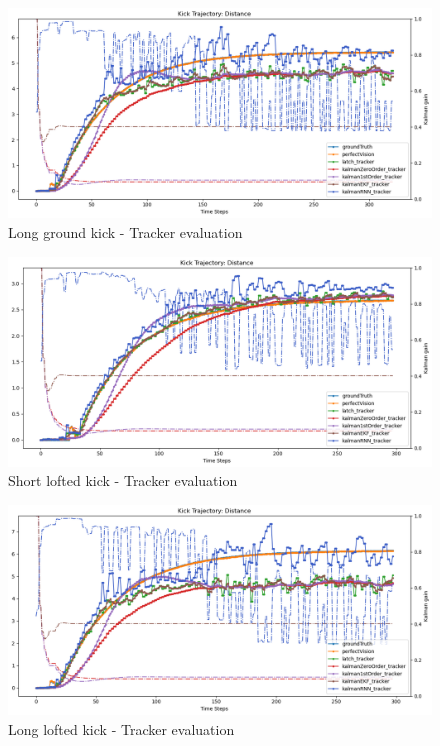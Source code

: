 \documentclass[a4paper,twoside,12pt]{report}
\begin{document}
\begin{figure}[h!]
\begin{center}
\includegraphics[width=12cm]{images/eval_ground_long.png}
\caption{Long ground kick - Tracker evaluation}
\label{fig:ekfgroundlong}
\end{center}
\end{figure}

\begin{figure}[h!]
\begin{center}
\includegraphics[width=12cm]{images/eval_loft_short.png}
\caption{Short lofted kick - Tracker evaluation}
\label{fig:ekfloftshort}
\end{center}
\end{figure}

\begin{figure}[h!]
\begin{center}
\includegraphics[width=12cm]{images/eval_loft_long.png}
\caption{Long lofted kick - Tracker evaluation}
\label{fig:ekfloftlong}
\end{center}
\end{figure}
\end{document}

